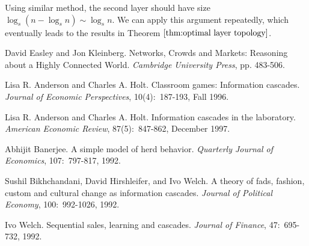 \documentclass[a4paper,UKenglish]{lipics}
\theoremstyle{definition}
\begin{document}
Using similar method, the second layer should have size $\log_s ( n - \log_s n) \sim \log_s n$.
We can apply this argument repeatedly, which eventually leads to the results in Theorem $\ref{thm:optimal layer topology}$.




%


\nocite{Simpson}

\begin{thebibliography}{50}

David Easley and Jon Kleinberg. Networks, Crowds and Markets: Reasoning about a Highly Connected World. {\em Cambridge University Press}, pp. 483-506.

Lisa R. Anderson and Charles A. Holt. Classroom games: Information cascades. {\em Journal of Economic Perspectives}, 10(4):~187-193, Fall 1996.

Lisa R. Anderson and Charles A. Holt. Information cascades in the laboratory. {\em American Economic Review}, 87(5):~847-862, December 1997.

Abhijit Banerjee. A simple model of herd behavior. {\em Quarterly Journal of Economics}, 107:~797-817, 1992.

Sushil Bikhchandani, David Hirshleifer, and Ivo Welch. A theory of fads, fashion, custom and cultural change as information cascades. {\em Journal of Political Economy}, 100:~992-1026, 1992.

Ivo Welch. Sequential sales, learning and cascades. {\em Journal of Finance}, 47:~695-732, 1992.

\end{thebibliography}
\end{document}
